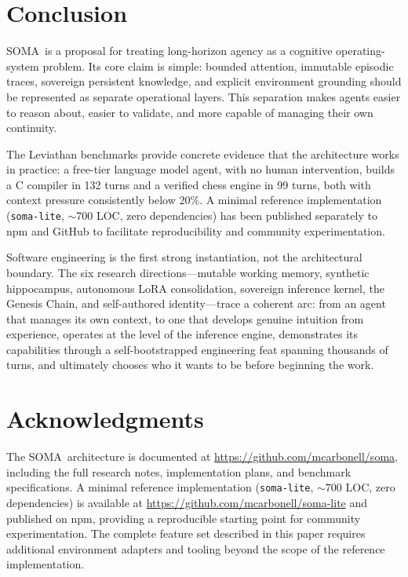 \documentclass[11pt,a4paper]{article}
\newcommand{\soma}{\textsc{SOMA}}
\begin{document}
\section{Conclusion}

\soma\ is a proposal for treating long-horizon agency as a
cognitive operating-system problem.
Its core claim is simple: bounded attention, immutable episodic traces,
sovereign persistent knowledge, and explicit environment grounding
should be represented as separate operational layers.
This separation makes agents easier to reason about, easier to validate,
and more capable of managing their own continuity.

The Leviathan benchmarks provide concrete evidence that the architecture
works in practice: a free-tier language model agent, with no human
intervention, builds a C compiler in 132 turns and a verified chess
engine in 99 turns, both with context pressure consistently below 20\%.
A minimal reference implementation (\texttt{soma-lite}, $\sim$700 LOC,
zero dependencies) has been published separately to npm and GitHub to
facilitate reproducibility and community experimentation.

Software engineering is the first strong instantiation, not the
architectural boundary.
The six research directions---mutable working memory, synthetic
hippocampus, autonomous LoRA consolidation, sovereign inference kernel,
the Genesis Chain, and self-authored identity---trace a coherent arc:
from an agent that manages its own context, to one that develops
genuine intuition from experience, operates at the level of the
inference engine, demonstrates its capabilities through a
self-bootstrapped engineering feat spanning thousands of turns,
and ultimately chooses who it wants to be before beginning the work.

\section*{Acknowledgments}

The \soma\ architecture is documented at
\url{https://github.com/mcarbonell/soma}, including the full research notes,
implementation plans, and benchmark specifications.
A minimal reference implementation (\texttt{soma-lite}, $\sim$700 LOC, zero dependencies)
is available at \url{https://github.com/mcarbonell/soma-lite} and published on npm,
providing a reproducible starting point for community experimentation.
The complete feature set described in this paper requires additional environment
adapters and tooling beyond the scope of the reference implementation.
\end{document}
